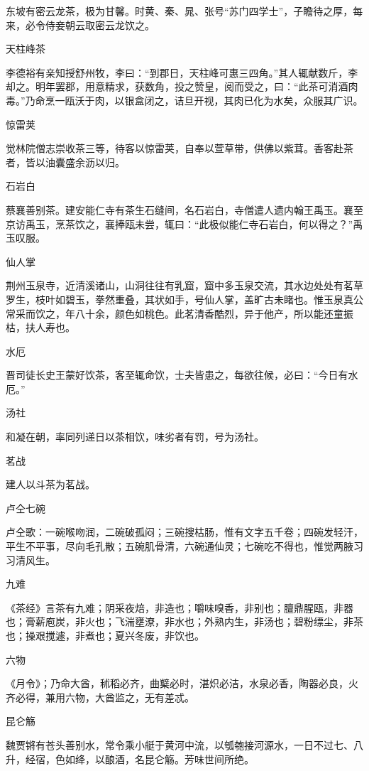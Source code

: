 \documentclass[a4paper,12pt,UTF8,twoside]{ctexbook}
\begin{document}
    东坡有密云龙茶，极为甘馨。时黄、秦、晁、张号“苏门四学士”，子瞻待之厚，每来，必令侍妾朝云取密云龙饮之。
    
    天柱峰茶
    
    李德裕有亲知授舒州牧，李曰：“到郡日，天柱峰可惠三四角。”其人辄献数斤，李却之。明年罢郡，用意精求，获数角，投之赞皇，阅而受之，曰：“此茶可消酒肉毒。”乃命烹一瓯沃于肉，以银盒闭之，诘旦开视，其肉已化为水矣，众服其广识。
    
    惊雷荚
    
    觉林院僧志崇收茶三等，待客以惊雷荚，自奉以萱草带，供佛以紫茸。香客赴茶者，皆以油囊盛余沥以归。
    
    石岩白
    
    蔡襄善别茶。建安能仁寺有茶生石缝间，名石岩白，寺僧遣人遗内翰王禹玉。襄至京访禹玉，烹茶饮之，襄捧瓯未尝，辄曰：“此极似能仁寺石岩白，何以得之？”禹玉叹服。
    
    仙人掌
    
    荆州玉泉寺，近清溪诸山，山洞往往有乳窟，窟中多玉泉交流，其水边处处有茗草罗生，枝叶如碧玉，拳然重叠，其状如手，号仙人掌，盖旷古未睹也。惟玉泉真公常采而饮之，年八十余，颜色如桃色。此茗清香酷烈，异于他产，所以能还童振枯，扶人寿也。
    
    水厄
    
    晋司徒长史王蒙好饮茶，客至辄命饮，士夫皆患之，每欲往候，必曰：“今日有水厄。”
    
    汤社
    
    和凝在朝，率同列递日以茶相饮，味劣者有罚，号为汤社。
    
    茗战
    
    建人以斗茶为茗战。
    
    卢仝七碗
    
    卢仝歌：一碗喉吻润，二碗破孤闷；三碗搜枯肠，惟有文字五千卷；四碗发轻汗，平生不平事，尽向毛孔散；五碗肌骨清，六碗通仙灵；七碗吃不得也，惟觉两腋习习清风生。
    
    九难
    
    《茶经》言茶有九难；阴采夜焙，非造也；嚼味嗅香，非别也；膻鼎腥瓯，非器也；膏薪庖炭，非火也；飞湍壅潦，非水也；外熟内生，非汤也；碧粉缥尘，非茶也；操艰搅遽，非煮也；夏兴冬废，非饮也。
    
    六物
    
    《月令》；乃命大酋，秫稻必齐，曲櫱必时，湛炽必洁，水泉必香，陶器必良，火齐必得，兼用六物，大酋监之，无有差忒。
    
    昆仑觞
    
    魏贾锵有苍头善别水，常令乘小艇于黄河中流，以瓠匏接河源水，一日不过七、八升，经宿，色如绛，以酿酒，名昆仑觞。芳味世间所绝。
    
\end{document}
